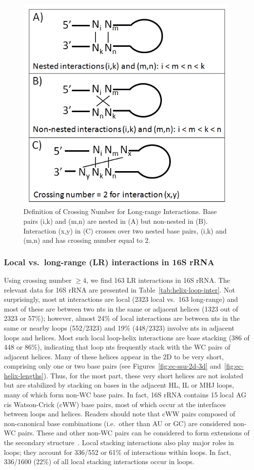 \begin{figure}
  \includegraphics[width=0.5\linewidth]{chapter-1/figs/nested}
  \caption{Definition of Crossing Number for Long-range Interactions. Base pairs
    (i,k) and (m,n) are nested in (A) but non-nested in (B). Interaction (x,y)
    in (C) crosses over two nested base pairs, (i,k) and (m,n) and has crossing
  number equal to 2.}
\label{fig:nesting}
\end{figure}

\subsubsection{Local vs.\ long-range (LR) interactions in 16S rRNA}

Using crossing number $\ge 4$, we find 163 LR interactions in 16S rRNA\@. The
relevant data for \EC{} 16S rRNA are presented in
Table~\ref{tab:helix-loop-inter}. Not surprisingly, most nt interactions are
local (2323 local vs.\ 163 long-range) and most of these are between two nts in
the same or adjacent helices (1323 out of 2323 or 57\%); however, almost 24\% of
local interactions are between nts in the same or nearby loops (552/2323) and
19\% (448/2323) involve nts in adjacent loops and helices. Most such local
loop-helix interactions are base stacking (386 of 448 or 86\%), indicating that
loop nts frequently stack with the WC pairs of adjacent helices. Many of these
helices appear in the 2D to be very short, comprising only one or two base pairs
(see Figures~\ref{fig:ec-ssu-2d-3d} and~\ref{fig:ec-helix-lengths}). Thus, for
the most part, these very short helices are not isolated but are stabilized by
stacking on bases in the adjacent HL, IL or MHJ loops, many of which form non-WC
base pairs. In fact, 16S rRNA contains 15 local AG cis Watson-Crick (cWW) base
pairs, most of which occur at the interfaces between loops and helices. Readers
should note that cWW pairs composed of non-canonical base combinations (i.e.\
other than AU or GC) are considered non-WC pairs. These and other non-WC pairs
can be considered to form extensions of the secondary
structure~\cite{Gutell1990}. Local stacking interactions also play major roles
in loops; they account for 336/552 or 61\% of interactions within loops. In
fact, 336/1600 (22\%) of all local stacking interactions occur in loops. 

